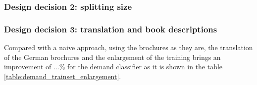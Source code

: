 \subsubsection{Design decision 2: splitting size}

\subsubsection{Design decision 3: translation and book descriptions}

Compared with a naive approach, using the brochures as they are, the translation of the German brochures and the enlargement of the training brings an improvement of ...\% for the demand classifier as it is shown in the table \ref{table:demand_trainset_enlargement}.

\endinput
\begin{itemize}
	\item Introduce our data set (show numbers, show examples)
	\item How we got our training data (everything at least twice, use the demands for learning, use the products for evaluation, Active Learning approach)
	\item Reference Precision/Recall from above again, final
	\item Evaluate of the training data generation, which approach is best (random, grouping)
\end{itemize}


